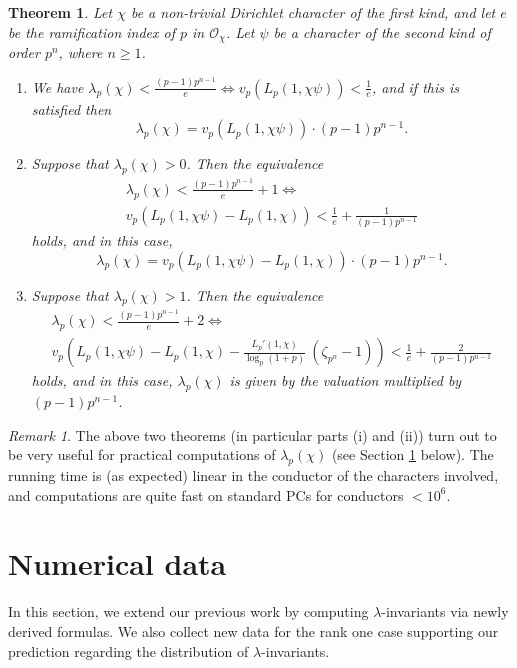 \documentclass[pdflatex,sn-mathphys-num]{sn-jnl}%
\theoremstyle{plain}
\newtheorem{thm}{Theorem}[section]
\theoremstyle{definition}
\theoremstyle{remark}
\newtheorem*{rem*}{Remark}
\numberwithin{equation}{section}
\begin{document}
\begin{thm} Let $\chi $ be a non-trivial Dirichlet character of the first kind, and let $e$ be the ramification index of $p$ in $\mathcal{O}_{\chi}$. Let $\psi$ be a character of the second kind of order $p^n$, where $n\geq 1$. 
\begin{enumerate}
\item[(i)] We have
$ \lambda_p(\chi) < \frac{(p-1)p^{n-1}}{e}   \Longleftrightarrow v_p(L_p(1,\chi \psi)) <  \frac{1}{e} $,
and if this  is satisfied then
$$  \lambda_p(\chi) = v_p(L_p(1,\chi \psi) ) \cdot (p-1)p^{n-1} . $$

\item[(ii)] Suppose that $\lambda_p(\chi)>0$. Then the equivalence
$$
\begin{multlined}
\lambda_p(\chi) < \frac{(p-1)p^{n-1}}{e} + 1 \Longleftrightarrow \\ 
v_p\left( L_p(1,\chi \psi) - L_p(1,\chi)   \right) < \frac{1}{e} + \frac{1}{(p-1)p^{n-1}}
\end{multlined}
$$
holds, and in this case,
$$  \lambda_p(\chi) = v_p\left( L_p(1,\chi \psi) - L_p(1,\chi)   \right) \cdot (p-1)p^{n-1} . $$

\item[(iii)] Suppose that $\lambda_p(\chi)>1$. Then the equivalence
$$
\begin{multlined} \lambda_p(\chi) < \frac{(p-1)p^{n-1}}{e} + 2 \Longleftrightarrow \\ 
v_p \left( L_p(1,\chi \psi) - L_p(1,\chi)   - \frac{L_p'(1,\chi )}{\log_p(1+p)}\: (\zeta_{p^n}-1) \right) < \frac{1}{e} + \frac{2}{(p-1)p^{n-1}}
\end{multlined}
$$
holds, and in this case, $\lambda_p(\chi)$ is given by the valuation multiplied by $(p-1)p^{n-1}$.

\end{enumerate}
\label{thm1}
\end{thm} 

\begin{rem*} The above two theorems (in particular parts (i) and (ii)) turn out to be very useful for practical computations of $\lambda_p(\chi)$ (see Section \ref{Sect6} below). The running time is (as expected) linear in the conductor of the characters involved, and computations are quite fast on standard PCs for conductors $<10^6$. 


\end{rem*}



 
\section{Numerical data}\label{Sect6}
In this section, we extend our previous work
by computing $\lambda$-invariants via newly derived formulas. We also collect new data for the rank one case supporting our prediction regarding the distribution of $\lambda$-invariants. 
\end{document}
